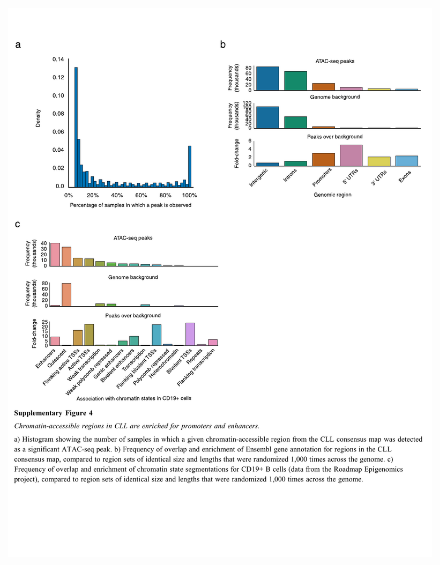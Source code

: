 \documentclass[10pt,]{article}
\begin{document}
\begin{figure}
\centering
\includegraphics[width=1.000\hsize]{figures/Supplementary_Information_04.pdf}
\end{figure}
\clearpage
\end{document}
